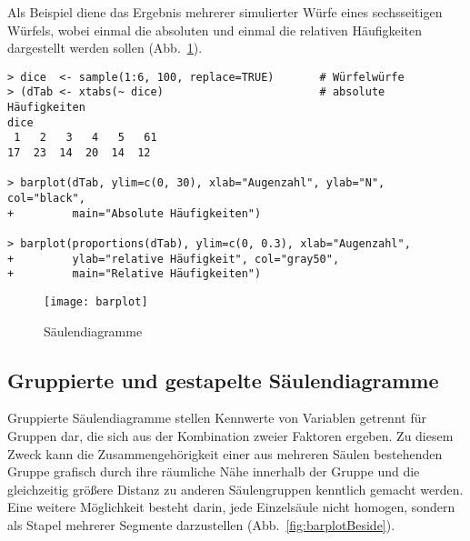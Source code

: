 Als Beispiel diene das Ergebnis mehrerer simulierter Würfe eines sechsseitigen Würfels, wobei einmal die absoluten und einmal die relativen Häufigkeiten dargestellt werden sollen (Abb.\ \ref{fig:barplot}).
\begin{lstlisting}
> dice  <- sample(1:6, 100, replace=TRUE)       # Würfelwürfe
> (dTab <- xtabs(~ dice)                        # absolute Häufigkeiten
dice
 1   2   3   4   5   61
17  23  14  20  14  12

> barplot(dTab, ylim=c(0, 30), xlab="Augenzahl", ylab="N", col="black",
+         main="Absolute Häufigkeiten")

> barplot(proportions(dTab), ylim=c(0, 0.3), xlab="Augenzahl",
+         ylab="relative Häufigkeit", col="gray50",
+         main="Relative Häufigkeiten")
\end{lstlisting}

\begin{figure}[ht]
\centering
\texttt{[image: barplot]}
\vspace*{-1em}
\caption{Säulendiagramme}
\label{fig:barplot}
\end{figure}

\subsection{Gruppierte und gestapelte Säulendiagramme}
\label{sec:barchartGroup}

Gruppierte Säulendiagramme stellen Kennwerte von Variablen getrennt für Gruppen dar, die sich aus der Kombination zweier Faktoren ergeben. Zu diesem Zweck kann die Zusammengehörigkeit einer aus mehreren Säulen bestehenden Gruppe grafisch durch ihre räumliche Nähe innerhalb der Gruppe und die gleichzeitig größere Distanz zu anderen Säulengruppen kenntlich gemacht werden. Eine weitere Möglichkeit besteht darin, jede Einzelsäule nicht homogen, sondern als Stapel mehrerer Segmente darzustellen (Abb.\ \ref{fig:barplotBeside}).

